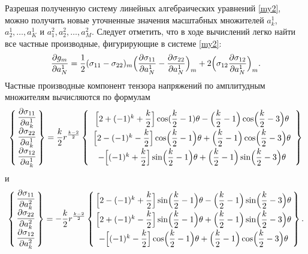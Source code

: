 Разрешая полученную систему линейных алгебраических уравнений \eqref{my2}, можно получить новые уточненные значения масштабных  множителей $a^1_k$, ${a^1_2, \dots, a^1_K}$ и $a^2_1, a^2_2, \dots, a^2_M$.
Следует отметить, что в ходе вычислений легко найти все частные производные, фигурирующие в системе \eqref{my2}:
\begin{equation}
\displaystyle\frac{\partial g_m}{\partial a^1_N}=\frac{1}{2}
(\sigma _{11}-\sigma_{22})_m\Bigl(\frac{\partial \sigma _{11}}{\partial a^1_N}-\frac{\partial \sigma _{22}}{\partial a^1_N}\Bigr)_m
+2\Bigl(\sigma _{12}\frac{\partial \sigma _{12}}{\partial a^1_N}\Bigr)_m.
\end{equation}
Частные производные компонент тензора напряжений по амплитудным множителям вычисляются по формулам
$$
\left\{
\!\!
\begin{array}{l}
\displaystyle\frac{\partial \sigma_{11}}{\partial a^1_k}\\[2mm]
\displaystyle\frac{\partial \sigma_{22}}{\partial a^1_k}\\[2mm]
\displaystyle\frac{\partial \sigma_{12}}{\partial a^1_k}\\[2mm]
\end{array}\!\! \right \}=
\frac{k}{2}r^{\frac{k-2}{2}}
\left \{\begin{array}{c}
\Bigl[2+(-1)^{k}+\displaystyle\frac{k}{2}\Bigr]\cos (\frac{k}{2}-1)\theta -
\Bigl(\frac{k}{2}-1\Bigr)\cos \Bigl(\frac{k}{2}-3\Bigr)\theta \\[2mm]
\Bigl[ 2-(-1)^k-\displaystyle\frac{k}{2}\Bigr]\cos \Bigl(\displaystyle\frac{k}{2}-1\Bigr)\theta+ 
\Bigl(\frac{k}{2}-1\Bigr)\cos \Bigl(\frac{k}{2}-3\Bigr)\theta\\[2mm]%
-\Bigl[(-1)^{k}+\displaystyle\frac{k}{2}\Bigr]\sin 
\Bigl(\displaystyle\frac{k}{2}-1\Bigr)\theta +\Bigl(\frac{k}{2}-1\Bigr)\sin \Bigl(\frac{k}{2}-3\Bigr)\theta
\end{array}
\right \}
$$
и
$$
\left\{\!\!
\begin{array}{l}
\displaystyle\frac{\partial \sigma_{11}}{\partial a^2_k}\\[2mm]
\displaystyle\frac{\partial \sigma_{22}}{\partial a^2_k}\\[2mm]
\displaystyle\frac{\partial \sigma_{12}}{\partial a^2_k}\\[2mm]
\end{array} \!\! \right \}=-
\frac{k}{2}r^{\frac{k-2}{2}}
\left \{\!\!
\begin{array}{c}
\Bigl[2-(-1)^{k}+\displaystyle\frac{k}{2} \Bigr]\sin \Bigl(\frac{k}{2}-1\Bigr)\theta -\Bigl(\frac{k}{2}-1\Bigr)\sin \Bigl(\frac{k}{2}-3\Bigr)\theta \\[2mm]
\Bigl[ 2+(-1)^k-\displaystyle\frac{k}{2} \Bigr]\sin \Bigl(\displaystyle\frac{k}{2}-1 \Bigr)\theta+ 
\Bigl(\frac{k}{2}-1\Bigr)\sin \Bigl(\frac{k}{2}-3\Bigr)\theta\\[2mm] %
-\Bigl[(-1)^{k}-\displaystyle\frac{k}{2}\Bigr]\cos \Bigl(\displaystyle\frac{k}{2}-1\Bigr)\theta + \Bigl(\frac{k}{2}-1\Bigr)\cos\Bigl(\frac{k}{2}-3\Bigr)\theta
\end{array}\!\!
\right \}.
$$


